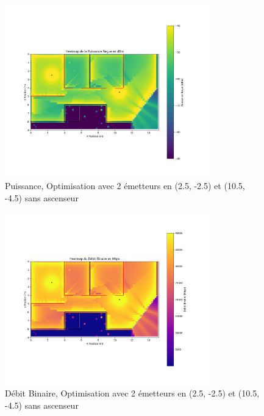 \begin{figure}[H]
    \centering
    \includegraphics[width=0.8\textwidth]{Pictures/opti2dbm.png}
    \caption{Puissance, Optimisation avec 2 émetteurs en (2.5, -2.5) et (10.5, -4.5) sans ascenseur}
    \label{opti2dbm}
\end{figure}
\begin{figure}[H]
    \centering
    \includegraphics[width=0.8\textwidth]{Pictures/opti2mbps.png}
    \caption{Débit Binaire, Optimisation avec 2 émetteurs en (2.5, -2.5) et (10.5, -4.5) sans ascenseur}
    \label{opti2mbps}
\end{figure}